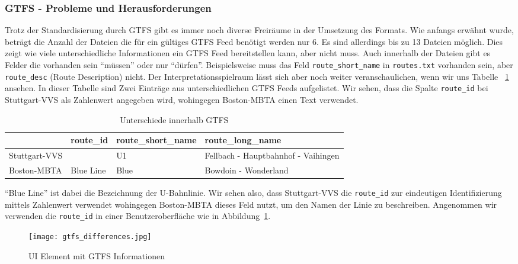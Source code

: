 \subsubsection{GTFS - Probleme und Herausforderungen}
\label{ssub:gtfs_probleme_und_herausforderungen}
  Trotz der Standardisierung durch GTFS gibt es immer noch diverse Freiräume in der Umsetzung des Formats. Wie anfangs erwähnt wurde, beträgt die Anzahl der Dateien die für ein gültiges GTFS Feed benötigt werden nur 6. Es sind allerdings bis zu 13 Dateien möglich. Dies zeigt wie viele unterschiedliche Informationen ein GTFS Feed bereitstellen kann, aber nicht muss. 
  Auch innerhalb der Dateien gibt es Felder die vorhanden sein "`müssen"' oder nur "`dürfen"'. Beispielsweise muss das Feld \texttt{route\_short\_name} in \texttt{routes.txt} vorhanden sein, aber \texttt{route\_desc} (Route Description) nicht. Der Interpretationsspielraum lässt sich aber noch weiter veranschaulichen, wenn wir uns Tabelle ~\ref{table:gtfs_differences} ansehen. In dieser Tabelle sind Zwei Einträge aus unterschiedlichen GTFS Feeds aufgelistet.
  Wir sehen, dass die Spalte \texttt{route\_id} bei Stuttgart-VVS als Zahlenwert angegeben wird, wohingegen Boston-MBTA einen Text verwendet.

  \begin{longtable}{|>{\raggedright \arraybackslash}p{3.0cm}|>{\raggedright \arraybackslash}p{2.0cm}|>{\raggedright \arraybackslash}p{3.5cm}|>{\raggedright \arraybackslash}p{5.5cm}|}
  \caption{Unterschiede innerhalb GTFS} 
  \label{table:gtfs_differences}\\
    \hline
     & route\_id & route\_short\_name & route\_long\_name\\
    \hline
    Stuttgart-VVS & 379 & U1 & Fellbach - Hauptbahnhof - Vaihingen\\
    \hline
    Boston-MBTA & Blue Line & Blue & Bowdoin - Wonderland\\
    \hline
  \end{longtable}

  "`Blue Line"' ist dabei die Bezeichnung der U-Bahnlinie\parencite{wiki_blue_line}. Wir sehen also, dass Stuttgart-VVS die \texttt{route\_id} zur eindeutigen Identifizierung mittels Zahlenwert verwendet wohingegen Boston-MBTA dieses Feld nutzt, um den Namen der Linie zu beschreiben. Angenommen wir verwenden die \texttt{route\_id} in einer Benutzeroberfläche wie in Abbildung~\ref{fig:gtfs_differences}.

  \begin{figure}[htbp]
    \begin{center}
      \texttt{[image: gtfs\_differences.jpg]}
      \caption{UI Element mit GTFS Informationen}
      \label{fig:gtfs_differences}
    \end{center}
  \end{figure}

